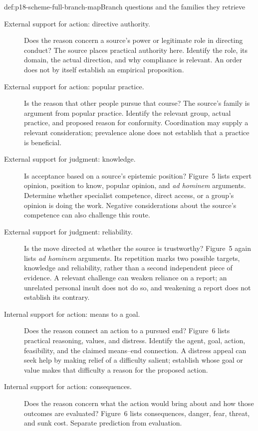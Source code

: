 \begin{hbmethod}{def:p18-scheme-full-branch-map}{Branch questions and the families they retrieve}
\begin{description}
\item[External support for action: directive authority.]
Does the reason concern a source's power or legitimate role in directing
conduct? The source places practical authority here. Identify the role,
its domain, the actual direction, and why compliance is relevant.
An order does not by itself establish an empirical proposition.
\item[External support for action: popular practice.]
Is the reason that other people pursue that course?
The source's family is argument from popular practice.
Identify the relevant group, actual practice, and proposed reason for
conformity. Coordination may supply a relevant consideration; prevalence
alone does not establish that a practice is beneficial.
\item[External support for judgment: knowledge.]
Is acceptance based on a source's epistemic position?
Figure~5 lists expert opinion, position to know, popular opinion, and
\emph{ad hominem} arguments. Determine whether specialist competence,
direct access, or a group's opinion is doing the work.
Negative considerations about the source's competence can also
challenge this route.
\item[External support for judgment: reliability.]
Is the move directed at whether the source is trustworthy?
Figure~5 again lists \emph{ad hominem} arguments. Its repetition marks
two possible targets, knowledge and reliability, rather than a second
independent piece of evidence. A relevant challenge can weaken reliance
on a report; an unrelated personal insult does not do so, and weakening
a report does not establish its contrary.
\item[Internal support for action: means to a goal.]
Does the reason connect an action to a pursued end?
Figure~6 lists practical reasoning, values, and distress.
Identify the agent, goal, action, feasibility, and the claimed
means--end connection. A distress appeal can seek help by making
relief of a difficulty salient; establish whose goal or value makes
that difficulty a reason for the proposed action.
\item[Internal support for action: consequences.]
Does the reason concern what the action would bring about and how
those outcomes are evaluated? Figure~6 lists consequences, danger,
fear, threat, and sunk cost. Separate prediction from evaluation.

\end{description}
\end{hbmethod}
